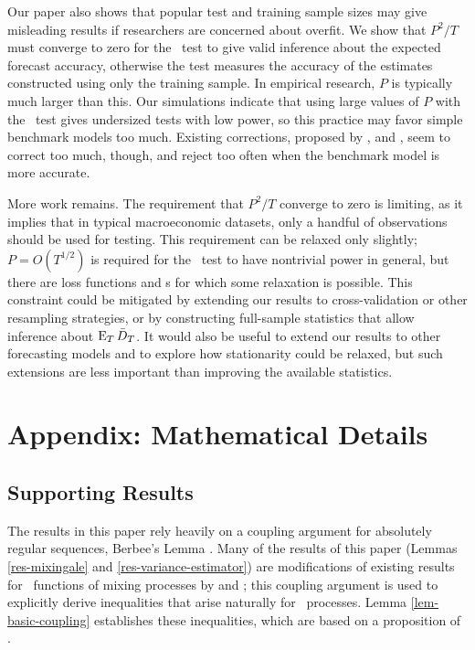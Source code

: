 \documentclass[11pt]{article}
\begin{document}
Our paper also shows that popular test and training sample sizes may
give misleading results if researchers are concerned about overfit.
We show that $P^2/T$ must converge to zero for the \dmw\ test to give
valid inference about the expected forecast accuracy, otherwise the
test measures the accuracy of the estimates constructed using only the
training sample.  In empirical research, $P$ is typically much larger
than this.  Our simulations indicate that using large values of $P$
with the \dmw\ test gives undersized tests with low power, so this
practice may favor simple benchmark models too much.  Existing
corrections, proposed by \citet{ClM:01,ClM:05}, \citet{Mcc:07} and
\citet{ClW:06,ClW:07}, seem to correct too much, though, and reject
too often when the benchmark model is more accurate.

More work remains.  The requirement that $P^2/T$ converge to zero is
limiting, as it implies that in typical macroeconomic datasets, only a
handful of observations should be used for testing.  This requirement
can be relaxed only slightly; $P = O(T^{1/2})$ is required for the
\oos\ test to have nontrivial power in general, but there are loss
functions and \dgp s for which some relaxation is possible.  This
constraint could be mitigated by extending our results to
cross-validation or other resampling strategies, or by constructing
full-sample statistics that allow inference about $\operatorname{E}_T \bar{D}_T$.
It would also be useful to extend our results to other forecasting
models and to explore how stationarity could be relaxed, but such
extensions are less important than improving the available statistics.

\appendix
\section*{Appendix: Mathematical Details}
\setcounter{section}{1}
\setcounter{lem}{0}
\renewcommand{\thelem}{A\arabic{lem}}

\subsection*{Supporting Results}
The results in this paper rely heavily on a coupling argument for
absolutely regular sequences, Berbee's Lemma \citep{Ber:79}.  Many of
the results of this paper (Lemmas \ref{res-mixingale} and
\ref{res-variance-estimator}) are modifications of existing results
for \ned\ functions of mixing processes by \citet{Jon:97} and
\citet{JoD:00}; this coupling argument is used to explicitly derive
inequalities that arise naturally for \ned\ processes.  Lemma
\ref{lem-basic-coupling} establishes these inequalities, which are
based on a proposition of \citet{MeP:02}.
\end{document}
